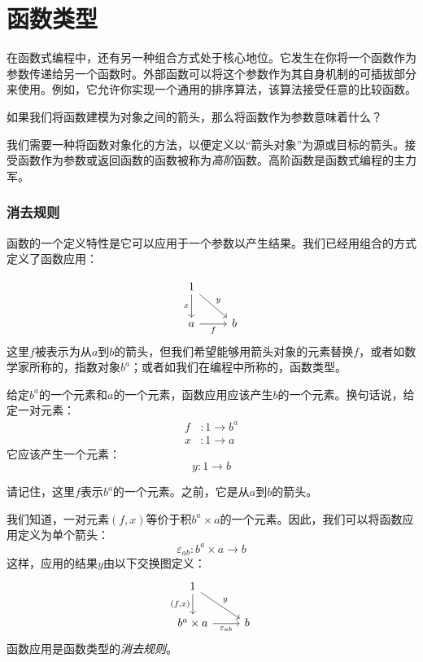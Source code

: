 \documentclass[DaoFP]{subfiles}
\begin{document}
\setcounter{chapter}{5}

\chapter{函数类型}

在函数式编程中，还有另一种组合方式处于核心地位。它发生在你将一个函数作为参数传递给另一个函数时。外部函数可以将这个参数作为其自身机制的可插拔部分来使用。例如，它允许你实现一个通用的排序算法，该算法接受任意的比较函数。

如果我们将函数建模为对象之间的箭头，那么将函数作为参数意味着什么？

我们需要一种将函数对象化的方法，以便定义以“箭头对象”为源或目标的箭头。接受函数作为参数或返回函数的函数被称为\emph{高阶}函数。高阶函数是函数式编程的主力军。

\subsection{消去规则}

函数的一个定义特性是它可以应用于一个参数以产生结果。我们已经用组合的方式定义了函数应用：

\[
 \begin{tikzcd}
 1
 \arrow[d, "x"']
 \arrow[rd, "y"]
 \\
 a
 \arrow[r, "f"']
& b
 \end{tikzcd}
\]
这里$f$被表示为从$a$到$b$的箭头，但我们希望能够用箭头对象的元素替换$f$，或者如数学家所称的，指数对象$b^a$；或者如我们在编程中所称的，函数类型。

给定$b^a$的一个元素和$a$的一个元素，函数应用应该产生$b$的一个元素。换句话说，给定一对元素：
\begin{align*}
f &\colon 1 \to b^a \\
x &\colon 1 \to a
\end{align*}
它应该产生一个元素：
\[y \colon 1 \to b \]

请记住，这里$f$表示$b^a$的一个元素。之前，它是从$a$到$b$的箭头。

我们知道，一对元素$(f, x)$等价于积$b^a \times a$的一个元素。因此，我们可以将函数应用定义为单个箭头：
\[\varepsilon_{a b} \colon b^a \times a \to b\]
这样，应用的结果$y$由以下交换图定义：
\[
 \begin{tikzcd}
 1
 \arrow[d, "{(f, x)}"']
 \arrow[rd, "y"]
 \\
 b^a \times a
 \arrow[r, "\varepsilon_{a b}"']
& b
 \end{tikzcd}
\]
函数应用是函数类型的\emph{消去规则}。
\end{document}
